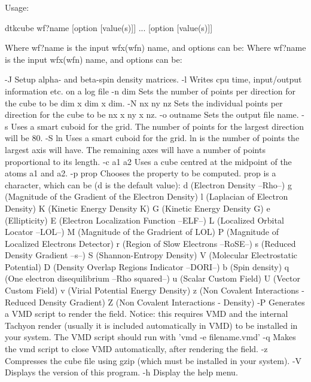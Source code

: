 Usage:

	dtkcube wf?name [option [value(s)]] ... [option [value(s)]]

Where wf?name is the input wfx(wfn) name, and options can be:
Where wf?name is the input wfx(wfn) name, and options can be:

  -J        	Setup alpha- and beta-spin density matrices.
  -l        	Writes cpu time, input/output information etc. on a log file
  -n  dim   	Sets the number of points per direction for the cube
            	  to be dim x dim x dim.
  -N nx ny nz	Sets the individual points per direction for the cube
            	  to be nx x ny x nz.
  -o outname	Sets the output file name.
  -s        	Uses a smart cuboid for the grid. The number of points for the
            	  largest direction will be 80.
  -S ln     	Uses a smart cuboid for the grid. ln is the number of points
            	  the largest axis will have. The remaining axes will have
            	  a number of points proportional to its length.
  -c a1 a2  	Uses a cube centred at the midpoint of the atoms a1 and a2.
  -p prop	Chooses the property to be computed. prop is a character,
         	  which can be (d is the default value): 
         		d (Electron Density --Rho--)
         		g (Magnitude of the Gradient of the Electron Density)
         		l (Laplacian of Electron Density)
         		K (Kinetic Energy Density K)
         		G (Kinetic Energy Density G)
         		e (Ellipticity)
         		E (Electron Localization Function --ELF--)
         		L (Localized Orbital Locator --LOL--)
         		M (Magnitude of the Gradrient of LOL)
         		P (Magnitude of Localized Electrons Detector)
         		r (Region of Slow Electrons --RoSE--)
         		s (Reduced Density Gradient --s--)
         		S (Shannon-Entropy Density)
         		V (Molecular Electrostatic Potential)
         		D (Density Overlap Regions Indicator --DORI--)
         		b (Spin density)
         		q (One electron disequilibrium --Rho squared--)
         		u (Scalar Custom Field)
         		U (Vector Custom Field)
         		v (Virial Potential Energy Density)
         		z (Non Covalent Interactions - Reduced Density Gradient)
         		Z (Non Covalent Interactions - Density)
  -P     	Generates a VMD script to render the field. Notice: this requires VMD and the internal
         	  Tachyon render (usually it is included automatically in VMD) to be installed
         	  in your system. The VMD script should run with 'vmd -e filename.vmd'
  -q     	Makes the vmd script to close VMD automatically, after rendering the field.
  -z     	Compresses the cube file using gzip (which must be installed
         	   in your system).
  -V        	Displays the version of this program.
  -h		Display the help menu.

